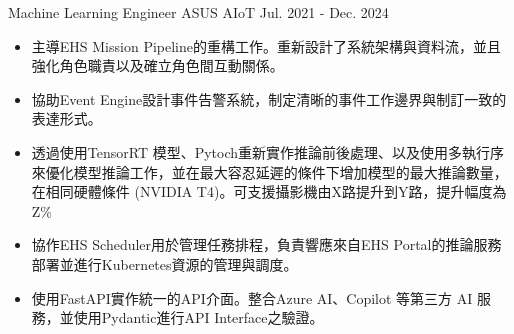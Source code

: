 

\begin{cventries}


  \cventrynew
    {Machine Learning Engineer} %
    {ASUS AIoT} %
    {Jul. 2021 - Dec. 2024} %
    {
      \begin{cvitems} %
        \begin{itemize}
            \item 主導EHS Mission Pipeline的重構工作。重新設計了系統架構與資料流，並且強化角色職責以及確立角色間互動關係。
            \item 協助Event Engine設計事件告警系統，制定清晰的事件工作邊界與制訂一致的表達形式。
        \end{itemize}
        \begin{itemize}
            \item 透過使用TensorRT 模型、Pytoch重新實作推論前後處理、以及使用多執行序來優化模型推論工作，並在最大容忍延遲的條件下增加模型的最大推論數量，在相同硬體條件 (NVIDIA T4)。可支援攝影機由X路提升到Y路，提升幅度為Z\%
        \end{itemize}
        \begin{itemize}
            \item 協作EHS Scheduler用於管理任務排程，負責響應來自EHS Portal的推論服務部署並進行Kubernetes資源的管理與調度。
        \end{itemize}
        \begin{itemize}
            \item 使用FastAPI實作統一的API介面。整合Azure AI、Copilot 等第三方 AI 服務，並使用Pydantic進行API Interface之驗證。

\end{itemize}
\end{cvitems}}
\end{cventries}

